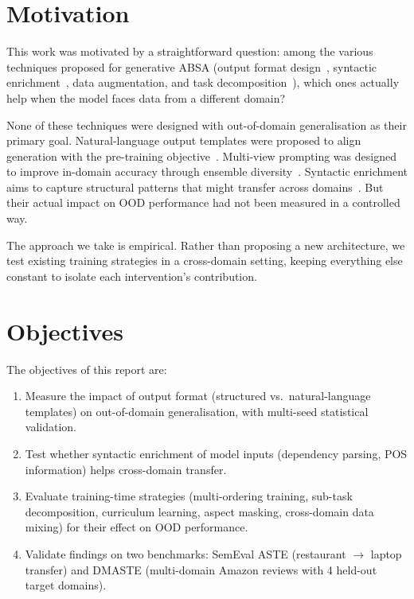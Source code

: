 \documentclass[12pt,a4paper]{report}
\begin{document}
\section{Motivation}

This work was motivated by a straightforward question: among the various techniques proposed for generative ABSA (output format design~\cite{zhang2021aspect}, syntactic enrichment~\cite{zhang2019aspect}, data augmentation, and task decomposition~\cite{xie2025star}), which ones actually help when the model faces data from a different domain?

None of these techniques were designed with out-of-domain generalisation as their primary goal. Natural-language output templates were proposed to align generation with the pre-training objective~\cite{zhang2021aspect}. Multi-view prompting was designed to improve in-domain accuracy through ensemble diversity~\cite{gou2023mvp}. Syntactic enrichment aims to capture structural patterns that might transfer across domains~\cite{zhang2019aspect}. But their actual impact on OOD performance had not been measured in a controlled way.

The approach we take is empirical. Rather than proposing a new architecture, we test existing training strategies in a cross-domain setting, keeping everything else constant to isolate each intervention's contribution.


\section{Objectives}

The objectives of this report are:

\begin{enumerate}
    \item Measure the impact of output format (structured vs.\ natural-language templates) on out-of-domain generalisation, with multi-seed statistical validation.

    \item Test whether syntactic enrichment of model inputs (dependency parsing, POS information) helps cross-domain transfer.

    \item Evaluate training-time strategies (multi-ordering training, sub-task decomposition, curriculum learning, aspect masking, cross-domain data mixing) for their effect on OOD performance.

    \item Validate findings on two benchmarks: SemEval ASTE (restaurant $\rightarrow$ laptop transfer) and DMASTE (multi-domain Amazon reviews with 4 held-out target domains).
\end{enumerate}
\end{document}
